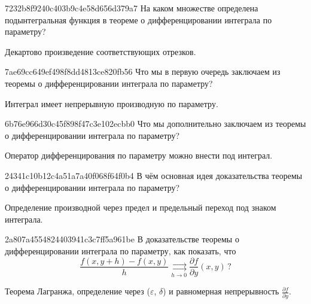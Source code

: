 \begin{note}{7232b8f9240c403b9c4e58d656d379a7}
    На каком множестве определена подынтегральная функция в теореме о дифференцировании интеграла по параметру?

    \begin{cloze}{1}
        Декартово произведение соответствующих отрезков.
    \end{cloze}
\end{note}

\begin{note}{7ae69cc649ef498f8dd4813ce820fb56}
    Что мы в первую очередь заключаем из теоремы о дифференцировании интеграла по параметру?

    \begin{cloze}{1}
        Интеграл имеет непрерывную производную по параметру.
    \end{cloze}
\end{note}

\begin{note}{6b76e966d30c45f898f47c3e102ecbb0}
    Что мы дополнительно заключаем из теоремы о дифференцировании интеграла по параметру?

    \begin{cloze}{1}
        Оператор дифференцирования по параметру можно внести под интеграл.
    \end{cloze}
\end{note}

\begin{note}{24341c10b12c4a51a7a40f068f64f0b4}
    В чём основная идея доказательства теоремы о дифференцировании интеграла по параметру?

    \begin{cloze}{1}
        Определение производной через предел и предельный переход под знаком интеграла.
    \end{cloze}
\end{note}

\begin{note}{2a807a4554824403941c3c7ff5a961be}
    В доказательстве теоремы о дифференцировании интеграла по параметру, как показать, что
    \[
        \frac{f(x, y + h) - f(x, y)}{h} \underset{h \to 0}{\rightrightarrows} \frac{\partial f}{\partial y}(x, y)\,?
    \]

    \begin{cloze}{1}
        Теорема Лагранжа, определение через (\({ \varepsilon }\), \({ \delta }\)) и равномерная непрерывность \({ \frac{\partial f}{\partial y} }\).
    \end{cloze}
\end{note}

